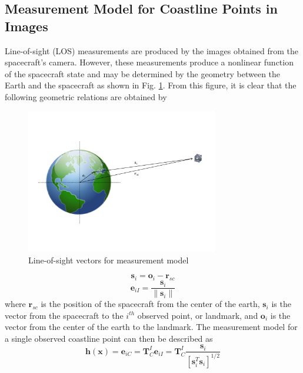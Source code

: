 \documentclass[]{aiaa-tc}%
\begin{document}

\subsection{Measurement Model for Coastline Points in Images} \label{ref:MeasModel}
Line-of-sight (LOS) measurements are produced by the images obtained from the spacecraft's camera.  However, these measurements produce a nonlinear function of the spacecraft state and may be determined by the geometry between the Earth and the spacecraft as shown in Fig. \ref{fig:LOSgeometry}.  From this figure, it is clear that the following geometric relations are obtained by
%
\begin{figure}[ht!]
\centering
\includegraphics[width=0.75\textwidth,trim=0.8in 1.5in 0.3in 1in,clip]{LOSgeometry} %
\caption{Line-of-sight vectors for measurement model}
\label{fig:LOSgeometry}
\end{figure}
%
\begin{equation} \label{eq:s}
\textbf{s}_i=\textbf{o}_i-\textbf{r}_{sc}
\end{equation}
%
\begin{equation} \label{eq:eii}
\textbf{e}_{iI}=\frac{\textbf{s}_i}{\|\textbf{s}_i\|}
\end{equation}
%
where $\textbf{r}_{sc}$ is the position of the spacecraft from the center of the earth, $\textbf{s}_i$ is the vector from the spacecraft to the $i^{th}$ observed point, or landmark, and $\textbf{o}_i$ is the vector from the center of the earth to the landmark.  The measurement model for a single observed coastline point can then be described as
%
\begin{equation} \label{eq:littleh}
\textbf{h}(\textbf{x})=\textbf{e}_{iC}=\textbf{T}_{C}^I\textbf{e}_{iI}=\textbf{T}_{C}^I\frac{\textbf{s}_i}{[\textbf{s}_i^T\textbf{s}_i]^{1/2}}
\end{equation}
\end{document}
